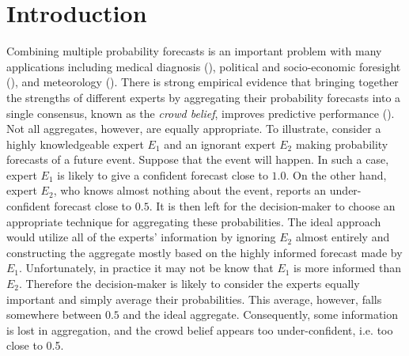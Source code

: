 \documentclass[11pt]{article}
\theoremstyle{definition}
\theoremstyle{definition}
\begin{document}
\section{Introduction}
Combining multiple probability forecasts is an important problem with many applications including medical diagnosis (\cite{wilson1998prediction, pepe2003statistical}), political and socio-economic foresight (\cite{tetlock2005expert}), and meteorology (\cite{sanders1963subjective, vislocky1995improved, baars2005performance}). There is strong empirical evidence that bringing together the strengths of different experts
 by aggregating their probability forecasts into a single consensus, known as the \textit{crowd belief},  improves predictive performance (\cite{clemen1989combining, armstrong2001combining}). Not all aggregates, however, are equally appropriate. To illustrate, consider a highly knowledgeable expert $E_1$ and an ignorant expert $E_2$ making probability forecasts of a future event. Suppose that the event will happen. In such a case, expert $E_1$ is likely to give a confident forecast close to $1.0$. On the other hand, expert $E_2$, who knows almost nothing about the event, reports an under-confident forecast close to $0.5$. It is then left for the decision-maker to choose an appropriate technique for aggregating these probabilities. The ideal approach would utilize all of the experts' information by ignoring $E_2$ almost entirely and constructing the aggregate mostly based on the highly informed forecast made by $E_1$. Unfortunately, in practice it may not be know that $E_1$ is more informed than $E_2$. Therefore the decision-maker is likely to consider the experts equally important and simply average their probabilities. This average, however, falls somewhere between $0.5$ and the ideal aggregate. Consequently, some information is lost in aggregation, and the crowd belief appears too under-confident, i.e. too close to 0.5. 







% 
\end{document}
